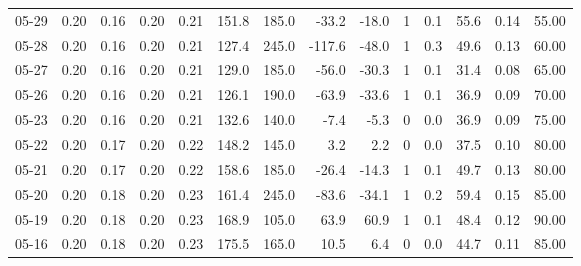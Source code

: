 \begin{threeparttable}
{\begin{tabular}{lrrrrrrrrrrrrr}
  05-29 &          0.20 &          0.16 &          0.20 &        0.21 &               151.8 &               185.0 &      -33.2 &        -18.0 &              1 &                 0.1 &             55.6 &            0.14 &                  55.00 \\
  05-28 &          0.20 &          0.16 &          0.20 &        0.21 &               127.4 &               245.0 &     -117.6 &        -48.0 &              1 &                 0.3 &             49.6 &            0.13 &                  60.00 \\
  05-27 &          0.20 &          0.16 &          0.20 &        0.21 &               129.0 &               185.0 &      -56.0 &        -30.3 &              1 &                 0.1 &             31.4 &            0.08 &                  65.00 \\
  05-26 &          0.20 &          0.16 &          0.20 &        0.21 &               126.1 &               190.0 &      -63.9 &        -33.6 &              1 &                 0.1 &             36.9 &            0.09 &                  70.00 \\
  05-23 &          0.20 &          0.16 &          0.20 &        0.21 &               132.6 &               140.0 &       -7.4 &         -5.3 &              0 &                 0.0 &             36.9 &            0.09 &                  75.00 \\
  05-22 &          0.20 &          0.17 &          0.20 &        0.22 &               148.2 &               145.0 &        3.2 &          2.2 &              0 &                 0.0 &             37.5 &            0.10 &                  80.00 \\
  05-21 &          0.20 &          0.17 &          0.20 &        0.22 &               158.6 &               185.0 &      -26.4 &        -14.3 &              1 &                 0.1 &             49.7 &            0.13 &                  80.00 \\
  05-20 &          0.20 &          0.18 &          0.20 &        0.23 &               161.4 &               245.0 &      -83.6 &        -34.1 &              1 &                 0.2 &             59.4 &            0.15 &                  85.00 \\
  05-19 &          0.20 &          0.18 &          0.20 &        0.23 &               168.9 &               105.0 &       63.9 &         60.9 &              1 &                 0.1 &             48.4 &            0.12 &                  90.00 \\
  05-16 &          0.20 &          0.18 &          0.20 &        0.23 &               175.5 &               165.0 &       10.5 &          6.4 &              0 &                 0.0 &             44.7 &            0.11 &                  85.00 \\

\end{tabular}}
\end{threeparttable}
